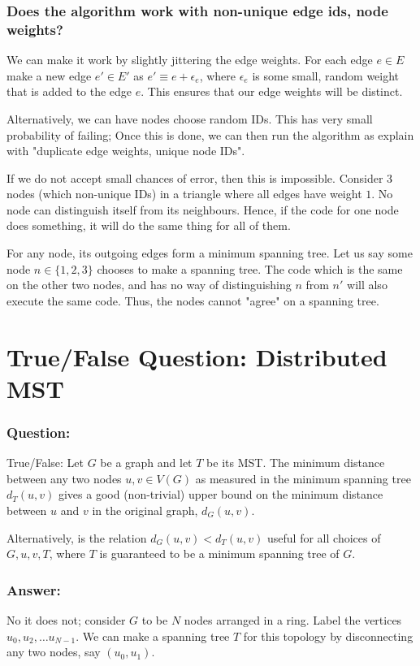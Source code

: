 \documentclass{article}
\begin{document}
\subsubsection{Does the algorithm work with non-unique edge ids, node weights?}
We can make it work by slightly jittering the edge weights. For each edge $e \in E$
make a new edge $e' \in E'$ as $e' \equiv e + \epsilon_e$, where $\epsilon_e$ 
is some small, random weight that is added to the edge $e$. This ensures that
our edge weights will be distinct. 

Alternatively, we can have nodes choose random IDs. This has very small probability
of failing; Once this is done, we can then run the algorithm as explain with
"duplicate edge weights, unique node IDs".

If we do not accept small chances of error, then this is impossible.
Consider 3 nodes (which non-unique IDs) in a triangle where all edges have
weight $1$.  No node can distinguish itself from its
neighbours. Hence, if the code for one node does something, it will do the
same thing for all of them.

For any node, its outgoing edges form a minimum spanning tree. Let us say
some node $n \in \{1, 2, 3\}$ chooses to make a spanning tree. The code which is the
same on the other two nodes, and has no way of distinguishing $n$ from $n'$
will also execute the same code. Thus, the nodes cannot "agree" on a spanning
tree.

\section{True/False Question: Distributed MST}
\subsubsection{Question:}
True/False: Let $G$ be a graph and let $T$ be its MST. The minimum distance between any two nodes $u, v \in V(G)$
as measured in the minimum spanning tree $d_T(u, v)$ gives a good (non-trivial) upper
bound on the minimum distance between $u$ and $v$ in the original graph, $d_G(u, v)$.

Alternatively, is the relation $d_G(u, v) < d_T(u, v)$ useful for all choices
of $G, u, v, T$, where $T$ is guaranteed to be a minimum spanning tree of $G$.

\subsubsection{Answer:} No it does not; consider $G$ to be $N$ nodes arranged
in a ring. Label the vertices $u_0, u_2, \dots u_{N-1}$. We can
make a spanning tree $T$ for this topology by disconnecting any two nodes, say $(u_0, u_1)$.
\end{document}
